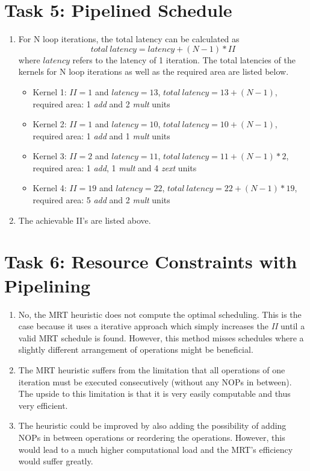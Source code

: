 \documentclass{article}
\begin{document}
    \section{Task 5: Pipelined Schedule}
    \begin{enumerate}
        \item For N loop iterations, the total latency can be calculated as \[total\ latency = latency + (N-1)*II\] where $latency$ refers to the latency of 1 iteration. The total latencies of the kernels for N loop iterations as well as the required area are listed below.
        \begin{itemize}
            \item Kernel 1: $II = 1$ and $latency = 13$, $total\ latency = 13 + (N-1)$, required area: 1 \emph{add} and 2 \emph{mult} units
            \item Kernel 2: $II = 1$ and $latency = 10$, $total\ latency = 10 + (N-1)$,
            required area: 1 \emph{add} and 1 \emph{mult} units
            \item Kernel 3: $II = 2$ and $latency = 11$, $total\ latency = 11 + (N-1)*2$,
            required area: 1 \emph{add}, 1 \emph{mult} and 4 \emph{zext} units
            \item Kernel 4: $II = 19$ and $latency = 22$, $total\ latency = 22 + (N-1)*19$, required area: 5 \emph{add} and 2 \emph{mult} units
        \end{itemize}
        \item The achievable II's are listed above.
    \end{enumerate}
    \section{Task 6: Resource Constraints with Pipelining}
    \begin{enumerate}
        \item No, the MRT heuristic does not compute the optimal scheduling. This is the case because it uses a iterative approach which simply increases the \emph{II} until a valid MRT schedule is found. However, this method misses schedules where a slightly different arrangement of operations might be beneficial.
        \item The MRT heuristic suffers from the limitation that all operations of one iteration must be executed consecutively (without any NOPs in between). The upside to this limitation is that it is very easily computable and thus very efficient.
        \item The heuristic could be improved by also adding the possibility of adding NOPs in between operations or reordering the operations. However, this would lead to a much higher computational load and the MRT's efficiency would suffer greatly.
    \end{enumerate}
\end{document}
